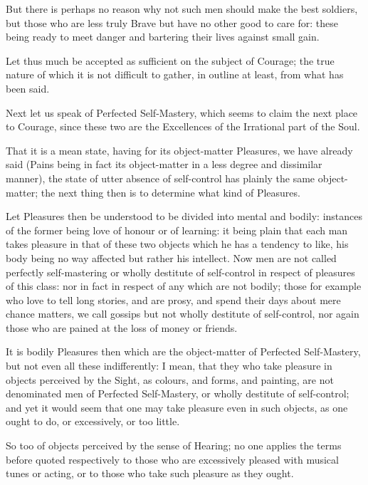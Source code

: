 But there is perhaps no reason why not such men should make the best soldiers,
but those who are less truly Brave but have no other good to care for: these
being ready to meet danger and bartering their lives against small gain.

Let thus much be accepted as sufficient on the subject of Courage; the true
nature of which it is not difficult to gather, in outline at least, from what
has been said.


Next let us speak of Perfected Self-Mastery, which seems to claim the next
place to Courage, since these two are the Excellences of the Irrational part of
the Soul.

That it is a mean state, having for its object-matter Pleasures, we have
already said (Pains being in fact its object-matter in a less degree and
dissimilar manner), the state of utter absence of self-control has plainly the
same object-matter; the next thing then is to determine what kind of Pleasures.

Let Pleasures then be understood to be divided into mental and bodily:
instances of the former being love of honour or of learning: it being plain
that each man takes pleasure in that of these two objects which he has a
tendency to like, his body being no way affected but rather his intellect. Now
men are not called perfectly self-mastering or wholly destitute of self-control
in respect of pleasures of this class: nor in fact in respect of any which are
not bodily; those for example who love to tell long stories, and are prosy, and
spend their days about mere chance matters, we call gossips but not wholly
destitute of self-control, nor again those who are pained at the loss of money
or friends.

It is bodily Pleasures then which are the object-matter of Perfected
Self-Mastery, but not even all these indifferently: I mean, that they who take
pleasure in objects perceived by the Sight, as colours, and forms, and
painting, are not denominated men of Perfected Self-Mastery, or wholly
destitute of self-control; and yet it would seem that one may take pleasure
even in such objects, as one ought to do, or excessively, or too little.

So too of objects perceived by the sense of Hearing; no one applies the terms
before quoted respectively to those who are excessively pleased with musical
tunes or acting, or to those who take such pleasure as they ought.

